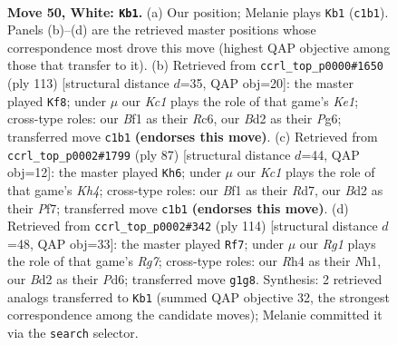 \documentclass[11pt]{article}
\begin{document}
\clearpage

\begin{figure}[p]\centering
\begin{subfigure}{0.46\textwidth}\centering
\resizebox{\linewidth}{!}{%
\newchessgame
\chessboard[
  setfen={4n3/p1pk4/8/5p2/r4P1R/8/r2B3P/2K2BR1 w - - 4 50},
  showmover=false,
  pgfstyle=straightmove, color=movearrow, markmove={c1-b1}
]}
\caption{}
\end{subfigure}\hfill
\begin{subfigure}{0.46\textwidth}\centering
\resizebox{\linewidth}{!}{%
\newchessgame
\chessboard[
  setfen={3rk3/R5R1/2r3pp/P5b1/4p3/6P1/4PPK1/8 b - - 6 57},
  showmover=false,
  pgfstyle=straightmove, color=movearrow, markmove={e8-f8}
]}
\caption{}
\end{subfigure}
\\[4pt]
\begin{subfigure}{0.46\textwidth}\centering
\resizebox{\linewidth}{!}{%
\newchessgame
\chessboard[
  setfen={8/1p1r1pRb/3P4/2r4k/P1N1p3/6RP/7K/8 b - - 3 44},
  showmover=false,
  pgfstyle=straightmove, color=movearrow, markmove={h5-h6}
]}
\caption{}
\end{subfigure}\hfill
\begin{subfigure}{0.46\textwidth}\centering
\resizebox{\linewidth}{!}{%
\newchessgame
\chessboard[
  setfen={8/4B1R1/3P4/3r3p/4kp2/8/3r1PK1/7N w - - 4 58},
  showmover=false,
  pgfstyle=straightmove, color=movearrow, markmove={g7-f7}
]}
\caption{}
\end{subfigure}
\caption{\textbf{Move 50, White: \texttt{Kb1}.} (a) Our position; Melanie plays \texttt{Kb1} (\texttt{c1b1}). Panels (b)--(d) are the retrieved master positions whose correspondence most drove this move (highest QAP objective among those that transfer to it). (b) Retrieved from \texttt{ccrl\_top\_p0000\#1650} (ply 113) [structural distance $d$=35, QAP obj=20]: the master played \texttt{Kf8}; under $\mu$ our \emph{Kc1} plays the role of that game's \emph{Ke1}; cross-type roles: our \emph{B}f1 as their \emph{R}c6, our \emph{B}d2 as their \emph{P}g6; transferred move \texttt{c1b1} \textbf{(endorses this move)}. (c) Retrieved from \texttt{ccrl\_top\_p0002\#1799} (ply 87) [structural distance $d$=44, QAP obj=12]: the master played \texttt{Kh6}; under $\mu$ our \emph{Kc1} plays the role of that game's \emph{Kh4}; cross-type roles: our \emph{B}f1 as their \emph{R}d7, our \emph{B}d2 as their \emph{P}f7; transferred move \texttt{c1b1} \textbf{(endorses this move)}. (d) Retrieved from \texttt{ccrl\_top\_p0002\#342} (ply 114) [structural distance $d$=48, QAP obj=33]: the master played \texttt{Rf7}; under $\mu$ our \emph{Rg1} plays the role of that game's \emph{Rg7}; cross-type roles: our \emph{R}h4 as their \emph{N}h1, our \emph{B}d2 as their \emph{P}d6; transferred move \texttt{g1g8}. Synthesis: 2 retrieved analogs transferred to \texttt{Kb1} (summed QAP objective 32, the strongest correspondence among the candidate moves); Melanie committed it via the \texttt{search} selector.}
\label{fig:thought-m98}
\end{figure}
\end{document}
